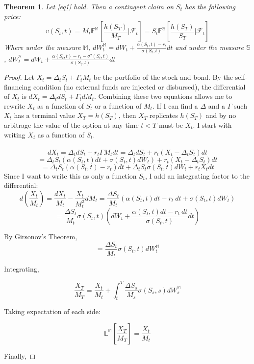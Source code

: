 \documentclass{article}
\newtheorem{theorem}{Theorem}
\begin{document}
\begin{theorem}\label{RND}
	Let \ref{eq1} hold.  Then a contingent claim on \(S_t\) has the following price:
	\[v(S_t, t)=M_t\mathbb{E^M}\left[\frac{h(S_T)}{M_T} | \mathcal{F}_t\right]=S_t\mathbb{E^S}\left[\frac{h(S_T)}{S_T}| \mathcal{F}_t \right]\]
	Where under the measure \(\mathbb{M}\), \(dW^\mathbb{M}_t=dW_t+\frac{\alpha(S_t, t)-r_t}{\sigma(S_t, t)}dt\) and under the measure \(\mathbb{S}\), \(dW^\mathbb{S}_t=dW_t+\frac{\alpha(S_t, t)-r_t -\sigma^2(S_t, t)}{\sigma(S_t, t)}dt\)
\end{theorem}
\begin{proof}
	Let \(X_t=\Delta_t S_t +\Gamma_t M_t\) be the portfolio of the stock and bond.  By the self-financing condition (no external funds are injected or disbursed), the differential of \(X_t\) is \(dX_t=\Delta_t dS_t + \Gamma_t d M_t\).  Combining these two equations allows me to rewrite \(X_t\) as a function of \(S_t\) or a function of \(M_t\).  If I can find a \(\Delta\) and a \(\Gamma\) such \(X_t\) has a terminal value \(X_T=h(S_T)\), then \(X_T\) replicates \(h(S_T)\) and by no arbitrage the value of the option  at any time \(t<T\) must be \(X_t\).  I start with writing \(X_t\) as a function of \(S_t\).
	\\
	\\
	\[dX_t=\Delta_t dS_t+r_t \Gamma M_t dt = \Delta_t dS_t+r_t \left(X_t-\Delta_t S_t\right) dt\]
	\[=\Delta_t S_t \left(\alpha(S_t, t)dt+\sigma(S_t, t)dW_t\right)+r_t \left(X_t-\Delta_t S_t\right) dt\]
	\[=\Delta_t S_t \left(\alpha(S_t, t)-r_t\right) dt+\Delta_t S_t \sigma(S_t, t)dW_t+r_t X_t dt\]
	Since I want to write this as only a function \(S_t\), I add an integrating factor to the differential:
	\[d\left(\frac{X_t}{M_t}\right)=\frac{dX_t}{M_t}-\frac{X_t}{M^2_t} dM_t = \frac{\Delta S_t}{M_t}\left(\alpha(S_t, t)dt-r_t\ dt+\sigma(S_t, t)dW_t \right) \]
	\[=\frac{\Delta S_t}{M_t}\sigma(S_t, t)\left( dW_t +\frac{\alpha(S_t, t)dt-r_t\ dt}{\sigma(S_t, t)} dt \right)\]
	
	By Girsonov's Theorem, 
	\[=\frac{\Delta S_t}{M_t}\sigma(S_t, t) dW^\mathbb{M}_t \]
	
	Integrating,
	
	\[\frac{X_T}{M_T}=\frac{X_t}{M_t}+\int_t ^ T \frac{\Delta S_s}{M_s}\sigma(S_s, s) dW^\mathbb{M}_s\]
	
	Taking expectation of each side:
	
	\[\mathbb{E^M}\left[\frac{X_T}{M_T}\right] = \frac{X_t}{M_t}\]
	
	Finally, 
	

\end{proof}
\end{document}
